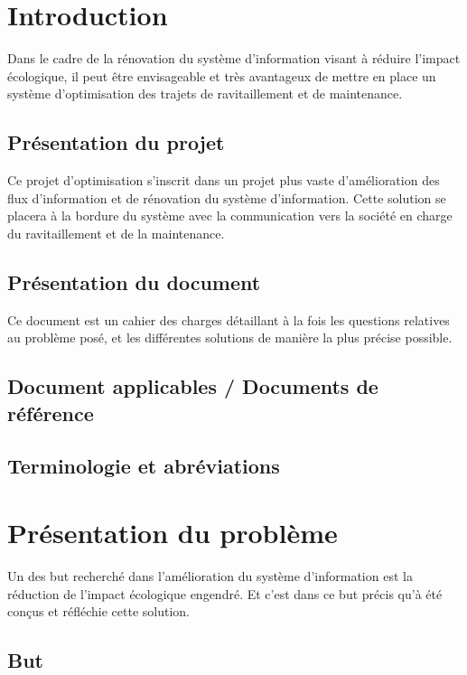\newpage
\section{Introduction}

        Dans le cadre de la rénovation du système d'information visant à réduire l'impact écologique, il peut être envisageable et très avantageux de mettre en place un système d'optimisation des trajets de ravitaillement et de maintenance.

    \subsection{Présentation du projet}
    
        Ce projet d'optimisation s'inscrit dans un projet plus vaste d'amélioration des flux d'information et de rénovation du système d'information.
        Cette solution se placera à la bordure du système avec la communication vers la société en charge du ravitaillement et de la maintenance.
        
    \subsection{Présentation du document}
        
        Ce document est un cahier des charges détaillant à la fois les questions relatives au problème posé, et les différentes solutions de manière la plus précise possible.
        
    \subsection{Document applicables / Documents de référence}
    
    \subsection{Terminologie et abréviations}
    
\section{Présentation du problème}
        
        Un des but recherché dans l'amélioration du système d'information est la réduction de l'impact écologique engendré. Et c'est dans ce but précis qu'à été conçus et réfléchie cette solution.
        
    \subsection{But}
    
